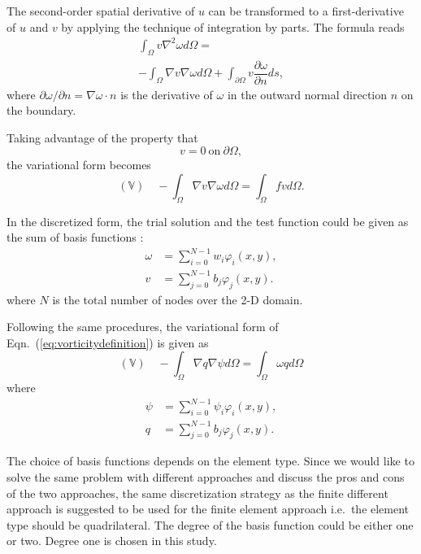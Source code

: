 \documentclass[11pt]{article}
\numberwithin{figure}{section}  %
\numberwithin{equation}{section}  %
\begin{document}
\begin{multicols}{2}
The second-order spatial derivative of $u$ can be transformed to a first-derivative of $u$ and $v$ by applying the technique of integration by parts. The formula reads
\begin{multline}
    \int_\Omega{v}\nabla^2\omega{d}\Omega = \\
    -\int_\Omega\nabla{v}\nabla\omega{d}\Omega + \int_{\partial\Omega}v\dfrac{\partial\omega}{\partial{n}}ds,
\end{multline}
where $\partial\omega/\partial{n}=\nabla\omega\cdot{n}$ is the derivative of $\omega$ in the outward normal direction $n$ on the boundary.

Taking advantage of the property that
\begin{equation}
    v = 0\ \mbox{on}\ \partial\Omega,
\end{equation}
the variational form becomes
\begin{equation}\label{eq:weakformvorticity}
    (\mathbb{V})\quad-\int_\Omega\nabla{v}\nabla\omega{d}\Omega = \int_\Omega{f}vd\Omega.
\end{equation}

In the discretized form, the trial solution and the test function could be given as the sum of basis functions \citep{gander2012euler}:
\begin{align*}
    \omega &= \sum_{i=0}^{N-1}w_i\varphi_i(x,y), \\
    v &= \sum_{j=0}^{N-1}b_j\varphi_j(x,y).
\end{align*}
where $N$ is the total number of nodes over the 2-D domain.

Following the same procedures, the variational form of Eqn.\ (\ref{eq:vorticitydefinition}) is given as
\begin{equation}\label{eq:weakformstream}
    (\mathbb{V})\quad-\int_\Omega\nabla{q}\nabla\psi{d}\Omega = \int_\Omega\omega{q}d\Omega
\end{equation}
where
\begin{align*}
    \psi &= \sum_{i=0}^{N-1}\psi_i\varphi_i(x,y), \\
    q &= \sum_{j=0}^{N-1}b_j\varphi_j(x,y).
\end{align*}

The choice of basis functions depends on the element type. Since we would like to solve the same problem with different approaches and discuss the pros and cons of the two approaches, the same discretization strategy as the finite different approach is suggested to be used for the finite element approach i.e.\ the element type should be quadrilateral. The degree of the basis function could be either one or two. Degree one is chosen in this study.


\end{multicols}
\end{document}
